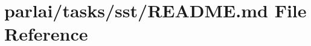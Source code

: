 \hypertarget{parlai_2tasks_2sst_2README_8md}{}\section{parlai/tasks/sst/\+R\+E\+A\+D\+ME.md File Reference}
\label{parlai_2tasks_2sst_2README_8md}
